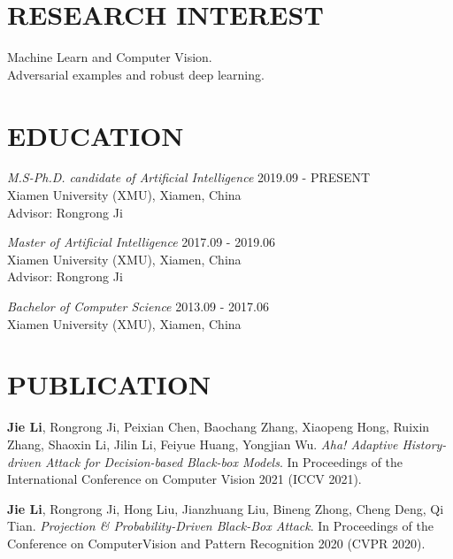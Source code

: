\documentclass[margin, 10pt]{res} %
\begin{document}
\begin{resume}


\section{RESEARCH INTEREST}
Machine Learn and Computer Vision. \\
Adversarial examples and robust deep learning.



\section{EDUCATION}

{\sl M.S-Ph.D. candidate of Artificial Intelligence} \hfill 2019.09 - PRESENT \\
Xiamen University (XMU), Xiamen, China \\
Advisor: Rongrong Ji

{\sl Master of Artificial Intelligence} \hfill 2017.09 - 2019.06 \\
Xiamen University (XMU), Xiamen, China \\
Advisor: Rongrong Ji

{\sl Bachelor of Computer Science} \hfill 2013.09 - 2017.06 \\
Xiamen University (XMU), Xiamen, China

\section{PUBLICATION}

\textbf{Jie Li}, Rongrong Ji, Peixian Chen, Baochang Zhang, Xiaopeng Hong, Ruixin Zhang, Shaoxin Li, Jilin Li, Feiyue Huang, Yongjian Wu. \textit{Aha! Adaptive History-driven Attack for Decision-based Black-box Models}.
In Proceedings of the International Conference on Computer Vision 2021 (ICCV 2021).

\textbf{Jie Li}, Rongrong Ji, Hong Liu, Jianzhuang Liu, Bineng Zhong, Cheng Deng, Qi Tian. \textit{Projection \& Probability-Driven Black-Box Attack}.
In Proceedings of the Conference on ComputerVision and Pattern Recognition 2020 (CVPR 2020).


\end{resume}
\end{document}
